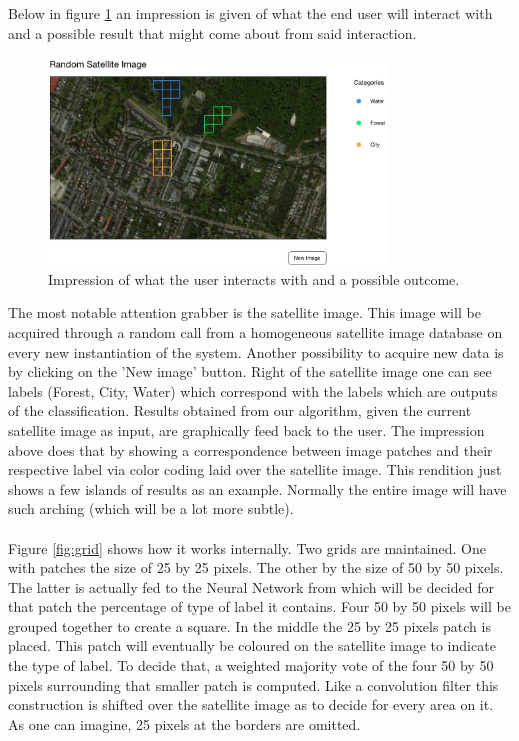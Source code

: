 \documentclass[a4paper,onecolumn]{report}
\begin{document}
Below in figure \ref{fig:impression} an impression is given of what the end user will interact with and a possible result that might come about from said interaction.\\

\begin{figure}[h!]
    \centering
    \includegraphics[width=0.8\textwidth]{./images/impression.jpg}
    \caption{Impression of what the user interacts with and a possible outcome.}
	\label{fig:impression}
\end{figure}
\noindent
The most notable attention grabber is the satellite image. This image will be acquired through a random call from a homogeneous satellite image database on every new instantiation of the system. Another possibility to acquire new data is by clicking on the 'New image' button. Right of the satellite image one can see labels (Forest, City, Water) which correspond with the labels which are outputs of the classification. Results obtained from our algorithm, given the current satellite image as input, are graphically feed back to the user. The impression above does that by showing a correspondence between image patches and their respective label via color coding laid over the satellite image. This rendition just shows a few islands of results as an example. Normally the entire image will have such arching (which will be a lot more subtle).\\
\\
Figure \ref{fig:grid} shows how it works internally. Two grids are maintained. One with patches the size of 25 by 25 pixels. The other by the size of 50 by 50 pixels. The latter is actually fed to the Neural Network from which will be decided for that patch the percentage of type of label it contains.  Four 50 by 50 pixels will be grouped together to create a square. In the middle the 25 by 25 pixels patch is placed. This patch will eventually be coloured on the satellite image to indicate the type of label. To decide that, a weighted majority vote of the four 50 by 50 pixels surrounding that smaller patch is computed. Like a convolution filter this construction is shifted over the satellite image as to decide for every area on it. As one can imagine, 25 pixels at the borders are omitted. 
\end{document}

